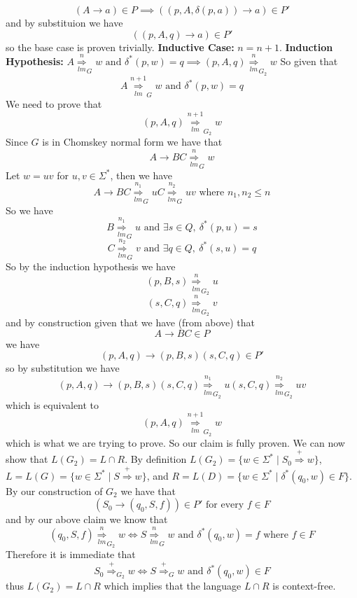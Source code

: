 \documentclass[12pt]{article}
\begin{document}
$$(A \rightarrow a) \in P \implies ((p,A,\delta(p,a)) \rightarrow a) \in P'$$
and by substituion we have
$$((p,A,q) \rightarrow a) \in P'$$
so the base case is proven trivially.
\medskip \newline
\textbf{Inductive Case: } $n = n+1$.
\newline \textbf{Induction Hypothesis: }
$A \underset{lm}{\overset{n}{\Longrightarrow}}_{G} w
\text{ and } \delta^*(p,w) = q \implies
(p,A,q) \underset{lm}{\overset{n}{\Longrightarrow}}_{G_2} w$
\medskip \newline
So given that
$$A \underset{lm}{\overset{n+1}{\Longrightarrow}}_{G} w
\text{ and } \delta^*(p,w) = q$$
We need to prove that
$$(p,A,q) \underset{lm}{\overset{n+1}{\Longrightarrow}}_{G_2} w$$
Since $G$ is in Chomskey normal form we have that
$$A \rightarrow BC \underset{lm}{\overset{n}{\Longrightarrow}}_{G} w$$
Let $w =uv$ for $u,v\in \Sigma^*$, then we have
$$A \rightarrow BC \underset{lm}{\overset{n_1}{\Longrightarrow}}_{G} uC
\underset{lm}{\overset{n_2}{\Longrightarrow}}_{G} uv
\text{ where } n_1,n_2\le n$$
So we have
$$B \underset{lm}{\overset{n_1}{\Longrightarrow}}_{G} u
\text{ and } \exists s\in Q,\ \delta^*(p,u) = s$$
$$C \underset{lm}{\overset{n_2}{\Longrightarrow}}_{G} v
\text{ and } \exists q\in Q,\ \delta^*(s,u) = q$$
So by the induction hypothesis we have
$$(p,B,s) \underset{lm}{\overset{n}{\Longrightarrow}}_{G_2} u$$
$$(s,C,q) \underset{lm}{\overset{n}{\Longrightarrow}}_{G_2} v$$
and by construction given that we have (from above) that
$$A \rightarrow BC \in P$$
we have
$$(p,A,q) \rightarrow (p,B,s)(s,C,q) \in P'$$
so by substitution we have
$$(p,A,q) \rightarrow (p,B,s)(s,C,q)
\underset{lm}{\overset{n_1}{\Longrightarrow}}_{G_2} u(s,C,q)
\underset{lm}{\overset{n_2}{\Longrightarrow}}_{G_2} uv$$
which is equivalent to
$$(p,A,q) \underset{lm}{\overset{n+1}{\Longrightarrow}}_{G_2} w$$
which is what we are trying to prove. So our claim is fully proven.
We can now show that $L(G_2) = L\cap R$. By definition
$L(G_2) = \{w \in \Sigma^* \mid S_0 \overset{+}{\Longrightarrow} w\}$,
$L = L(G) = \{w \in \Sigma^* \mid S \overset{+}{\Longrightarrow} w\}$, and
$R = L(D) = \{w \in \Sigma^* \mid \delta^*(q_0,w) \in F\}$. By our
construction of $G_2$ we have that
$$(S_0 \rightarrow (q_0,S,f)) \in P' \text{ for every } f \in F$$
and by our above claim we know that
$$(q_0,S,f) \underset{lm}{\overset{n}{\Longrightarrow}}_{G_2} w \iff
S \underset{lm}{\overset{n}{\Longrightarrow}}_{G} w
\text{ and } \delta^*(q_0,w) = f \text{ where } f\in F$$
Therefore it is immediate that
$$ S_0 \overset{+}{\Longrightarrow}_{G_2} w \iff
S \overset{+}{\Longrightarrow}_{G} w \text{ and } \delta^*(q_0,w) \in F$$
thus $L(G_2) = L\cap R$ which implies that the language $L\cap R$ is
context-free.
\end{document}
